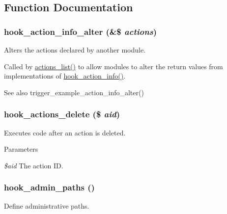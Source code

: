 \subsection{Function Documentation}
\hypertarget{group__hooks_ga141677d430a340c375bea9e1098a7a82}{
\subsubsection[{hook\_\-action\_\-info\_\-alter}]{\setlength{\rightskip}{0pt plus 5cm}hook\_\-action\_\-info\_\-alter (\&\$ {\em actions})}}
\label{group__hooks_ga141677d430a340c375bea9e1098a7a82}
Alters the actions declared by another module.

Called by \hyperlink{actions_8inc_ad0dbf276d4ca1834760cffc7e1b1be53}{actions\_\-list()} to allow modules to alter the return values from implementations of \hyperlink{group__actions_ga3df26c5d6496c91fcd0edd8648023fb4}{hook\_\-action\_\-info()}.

\begin{DoxySeeAlso}{See also}
trigger\_\-example\_\-action\_\-info\_\-alter() 
\end{DoxySeeAlso}
\hypertarget{group__hooks_ga21102314b21e33695c3967922b4d9efe}{
\subsubsection[{hook\_\-actions\_\-delete}]{\setlength{\rightskip}{0pt plus 5cm}hook\_\-actions\_\-delete (\$ {\em aid})}}
\label{group__hooks_ga21102314b21e33695c3967922b4d9efe}
Executes code after an action is deleted.


\begin{DoxyParams}{Parameters}
\item[{\em \$aid}]The action ID. \end{DoxyParams}
\hypertarget{group__hooks_ga3fe6d93afc8bb04afbd9e3c326d1bdc1}{
\subsubsection[{hook\_\-admin\_\-paths}]{\setlength{\rightskip}{0pt plus 5cm}hook\_\-admin\_\-paths ()}}
\label{group__hooks_ga3fe6d93afc8bb04afbd9e3c326d1bdc1}
Define administrative paths.

